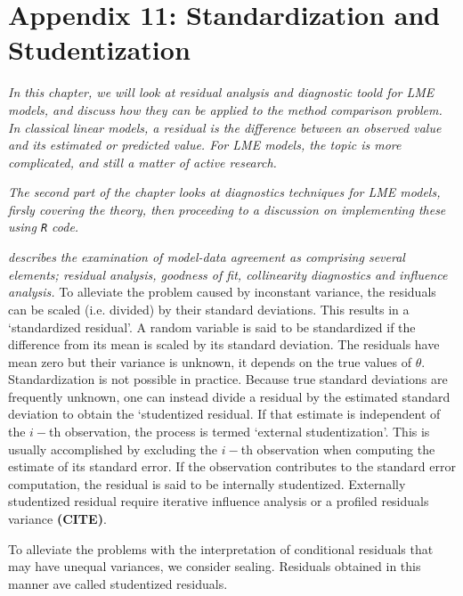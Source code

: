 \documentclass[12pt, a4paper]{report}
\theoremstyle{plain}
\theoremstyle{definition}
\theoremstyle{remark}
\begin{document}
\section{Appendix 11: Standardization and Studentization} %
\newpage
\textit{In this chapter, we will look at residual analysis and diagnostic toold for LME models, and discuss how they can be applied to the method comparison problem.	In classical linear models, a residual is the difference between an observed value and its estimated or predicted value. For LME models, the topic is more complicated, and still a matter of active research. }

\emph{The second part of the chapter looks at diagnostics techniques for LME models, firsly covering the theory, then proceeding to a discussion on 
	implementing these using \texttt{R} code.}

\emph{\citet{schabenberger} describes the examination of model-data agreement as comprising several elements; residual analysis, goodness of fit, collinearity diagnostics and influence analysis.}	
To alleviate the problem caused by inconstant variance, the residuals can be scaled (i.e. divided) by their standard deviations. This results in a `standardized residual'. A random variable is said to be standardized if the difference from its mean is scaled by its standard deviation. The residuals  have mean zero but their variance is unknown, it depends on the true values of $\theta$. Standardization is  not possible in practice. Because true standard deviations are frequently unknown, one can instead divide a residual by the estimated standard deviation to obtain the `studentized residual. 
If that estimate is independent of the $i-$th observation, the process is termed `external studentization'. This is usually accomplished by excluding the $i-$th observation when computing the estimate of its standard error. If the observation contributes to the
standard error computation, the residual is said to be internally studentized.
Externally  studentized residual require iterative influence analysis or a profiled residuals variance \textbf{(CITE)}.

To alleviate the problems with the interpretation of conditional residuals that may have unequal variances, we consider sealing.
Residuals obtained in this manner ave called studentized residuals.
\end{document}
